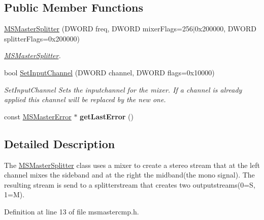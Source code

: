 \subsection*{Public Member Functions}
\begin{DoxyCompactItemize}
\item 
\hyperlink{class_m_s_master_splitter_abb9f371e43978f5d0c8746d35e8debb4_abb9f371e43978f5d0c8746d35e8debb4}{M\-S\-Master\-Splitter} (D\-W\-O\-R\-D freq, D\-W\-O\-R\-D mixer\-Flags=256$|$0x200000, D\-W\-O\-R\-D splitter\-Flags=0x200000)
\begin{DoxyCompactList}\small\item\em \hyperlink{class_m_s_master_splitter}{M\-S\-Master\-Splitter}. \end{DoxyCompactList}\item 
bool \hyperlink{class_m_s_master_splitter_ae3fbab075c1c6872ba503f18c92ac792_ae3fbab075c1c6872ba503f18c92ac792}{Set\-Input\-Channel} (D\-W\-O\-R\-D channel, D\-W\-O\-R\-D flags=0x10000)
\begin{DoxyCompactList}\small\item\em Set\-Input\-Channel Sets the inputchannel for the mixer. If a channel is already applied this channel will be replaced by the new one. \end{DoxyCompactList}\item 
\hypertarget{class_m_s_master_splitter_ab903ca4a666f5702d79eab169d65cc27_ab903ca4a666f5702d79eab169d65cc27}{const \hyperlink{class_m_s_master_error}{M\-S\-Master\-Error} $\ast$ {\bfseries get\-Last\-Error} ()}\label{class_m_s_master_splitter_ab903ca4a666f5702d79eab169d65cc27_ab903ca4a666f5702d79eab169d65cc27}

\end{DoxyCompactItemize}


\subsection{Detailed Description}
The \hyperlink{class_m_s_master_splitter}{M\-S\-Master\-Splitter} class uses a mixer to create a stereo stream that at the left channel mixes the sideband and at the right the midband(the mono signal). The resulting stream is send to a splitterstream that creates two outputstreams(0=S, 1=M). 

Definition at line 13 of file msmastercmp.\-h.



